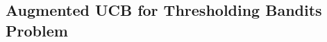 \documentclass[MS,synopsis]{iitmdiss}
\begin{document}
%


\subsection{Augmented UCB for Thresholding Bandits Problem}
\end{document}
